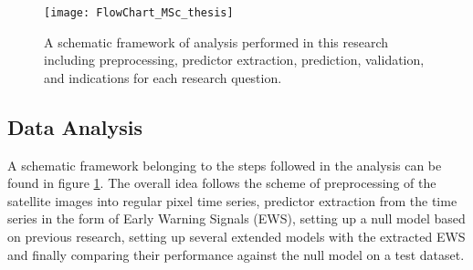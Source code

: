 
\begin{figure}[htp]
	\centering
	\texttt{[image: FlowChart\_MSc\_thesis]}
	\caption{A schematic framework of analysis performed in this research including preprocessing, predictor extraction, prediction, validation, and indications for each research question.}\label{fig:flowchart}
\end{figure}	

\restoregeometry{}

\subsection{Data Analysis}\label{subsec:analysis}
A schematic framework belonging to the steps followed in the analysis can be found in figure \ref{fig:flowchart}. The overall idea follows the scheme of preprocessing of the satellite images into regular pixel time series, predictor extraction from the time series in the form of Early Warning Signals (EWS), setting up a null model based on previous research, setting up several extended models with the extracted EWS and finally comparing their performance against the null model on a test dataset.\\



